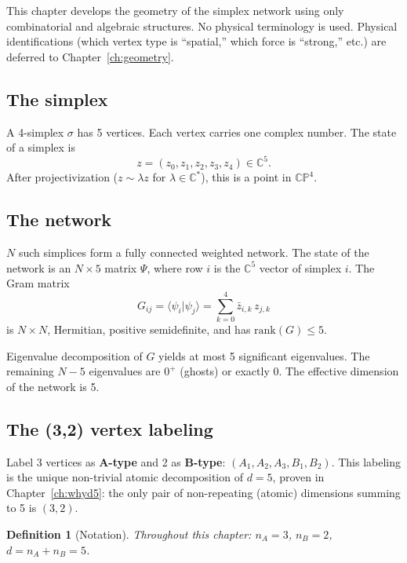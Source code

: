 \documentclass[12pt]{article}
\newtheorem{definition}[theorem]{Definition}
\theoremstyle{remark}
\theoremstyle{definition}
\newcommand{\CC}{\mathbb{C}}
\begin{document}
This chapter develops the geometry of the simplex network using only combinatorial and algebraic structures. No physical terminology is used. Physical identifications (which vertex type is ``spatial,'' which force is ``strong,'' etc.) are deferred to Chapter~\ref{ch:geometry}.

\subsection{The simplex}

A 4-simplex $\sigma$ has 5 vertices. Each vertex carries one complex number. The state of a simplex is
\begin{equation}
z = (z_0, z_1, z_2, z_3, z_4) \in \CC^5.
\end{equation}
After projectivization ($z \sim \lambda z$ for $\lambda \in \CC^*$), this is a point in $\mathbb{CP}^4$.

\subsection{The network}

$N$ such simplices form a fully connected weighted network. The state of the network is an $N \times 5$ matrix $\Psi$, where row $i$ is the $\CC^5$ vector of simplex $i$. The Gram matrix
\begin{equation}
G_{ij} = \langle\psi_i|\psi_j\rangle = \sum_{k=0}^{4} \bar{z}_{i,k}\, z_{j,k}
\end{equation}
is $N \times N$, Hermitian, positive semidefinite, and has $\text{rank}(G) \leq 5$.

Eigenvalue decomposition of $G$ yields at most 5 significant eigenvalues. The remaining $N - 5$ eigenvalues are $0^+$ (ghosts) or exactly 0. The effective dimension of the network is 5.

\subsection{The (3,2) vertex labeling}

Label 3 vertices as \textbf{A-type} and 2 as \textbf{B-type}: $(A_1, A_2, A_3, B_1, B_2)$. This labeling is the unique non-trivial atomic decomposition of $d = 5$, proven in Chapter~\ref{ch:whyd5}: the only pair of non-repeating (atomic) dimensions summing to 5 is $(3, 2)$.

\begin{definition}[Notation]
Throughout this chapter: $n_A = 3$, $n_B = 2$, $d = n_A + n_B = 5$.
\end{definition}
\end{document}
